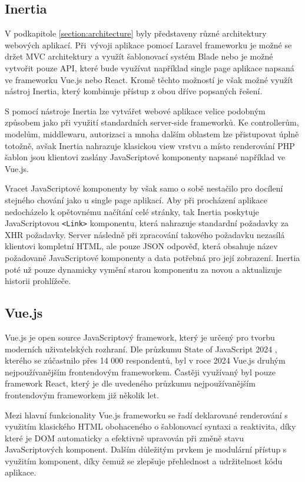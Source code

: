 \subsection{Inertia}\label{section:inertia}
V podkapitole \ref{section:architecture} byly představeny různé architektury webových aplikací. Při~vývoji aplikace pomocí Laravel frameworku je možné se držet MVC architektury a využít šablonovací systém Blade nebo je možné vytvořit pouze API, které bude využívat například single page aplikace napsaná ve frameworku Vue.js nebo React. Kromě těchto možností je však možné využít nástroj Inertia, který kombinuje přístup z obou dříve popsaných řešení.

S pomocí nástroje Inertia lze vytvářet webové aplikace velice podobným způsobem jako při využití standardních server-side frameworků. Ke controllerům, modelům, middlewaru, autorizaci a mnoha dalším oblastem lze přistupovat úplně totožně, avšak Inertia nahrazuje klasickou view vrstvu a místo renderování PHP šablon jsou klientovi zaslány JavaScriptové komponenty napsané například ve Vue.js. \cite{inertia}

Vracet JavaScriptové komponenty by však samo o sobě nestačilo pro docílení stejného chování jako u single page aplikací. Aby při procházení aplikace nedocházelo k opětovnému načítání celé stránky, tak Inertia poskytuje JavaScriptovou \texttt{<Link>} komponentu, která nahrazuje standardní požadavky za XHR požadavky. Server následně při zpracování takového požadavku nezasílá klientovi kompletní HTML, ale pouze JSON odpověď, která obsahuje název požadované JavaScriptové komponenty a data potřebná pro její zobrazení. Inertia poté už pouze dynamicky vymění starou komponentu za novou a aktualizuje historii prohlížeče. \cite{inertia}

\subsection{Vue.js}
Vue.js je open source JavaScriptový framework, který je určený pro tvorbu moderních uživatelských rozhraní. \cite{vue.js} Dle průzkumu State of JavaScript 2024 \cite{state-of-js-2024}, kterého se zúčastnilo přes 14 000 respondentů, byl v roce 2024 Vue.js druhým nejpoužívanějším frontendovým frameworkem. Častěji využívaný byl pouze framework React, který je dle uvedeného průzkumu nejpoužívanějším frontendovým frameworkem již několik let.

Mezi hlavní funkcionality Vue.js frameworku se řadí deklarované renderování s využitím klasického HTML obohaceného o šablonovací syntaxi a reaktivita, díky které je DOM automaticky a efektivně upravován při změně stavu JavaScriptových komponent. Dalším důležitým prvkem je modulární přístup s využitím komponent, díky čemuž se zlepšuje přehlednost a udržitelnost kódu aplikace. \cite{vue.js}

